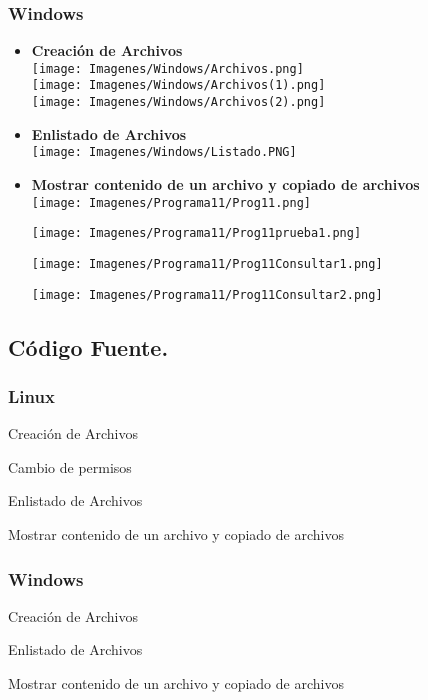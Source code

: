 \documentclass[12pt]{article}
\begin{document}
     \subsubsection{Windows}
     \begin{itemize}
        \item \textbf{Creación de Archivos}\\
         \texttt{[image: Imagenes/Windows/Archivos.png]}\\
         \texttt{[image: Imagenes/Windows/Archivos(1).png]}\\
         \texttt{[image: Imagenes/Windows/Archivos(2).png]}\\
         \newpage
        \item  \textbf{ Enlistado de Archivos}\\
        \texttt{[image: Imagenes/Windows/Listado.PNG]}\\
        \item \textbf{Mostrar contenido de un archivo y copiado de archivos}\\
        \texttt{[image: Imagenes/Programa11/Prog11.png]}
        
        \texttt{[image: Imagenes/Programa11/Prog11prueba1.png]}
        
        \texttt{[image: Imagenes/Programa11/Prog11Consultar1.png]}
        
        \texttt{[image: Imagenes/Programa11/Prog11Consultar2.png]}
    \end{itemize}
    
    \newpage
\subsection{Código Fuente.}
    \subsubsection{Linux}
    Creación de Archivos
    
    \newpage
    Cambio de permisos
    
    Enlistado de Archivos
    
    Mostrar contenido de un archivo y copiado de archivos
    
    
            
    \subsubsection{Windows}
    Creación de Archivos
     
     \newpage
     Enlistado de Archivos
     
     \newpage
     Mostrar contenido de un archivo y copiado de archivos
     
     
\end{document}
